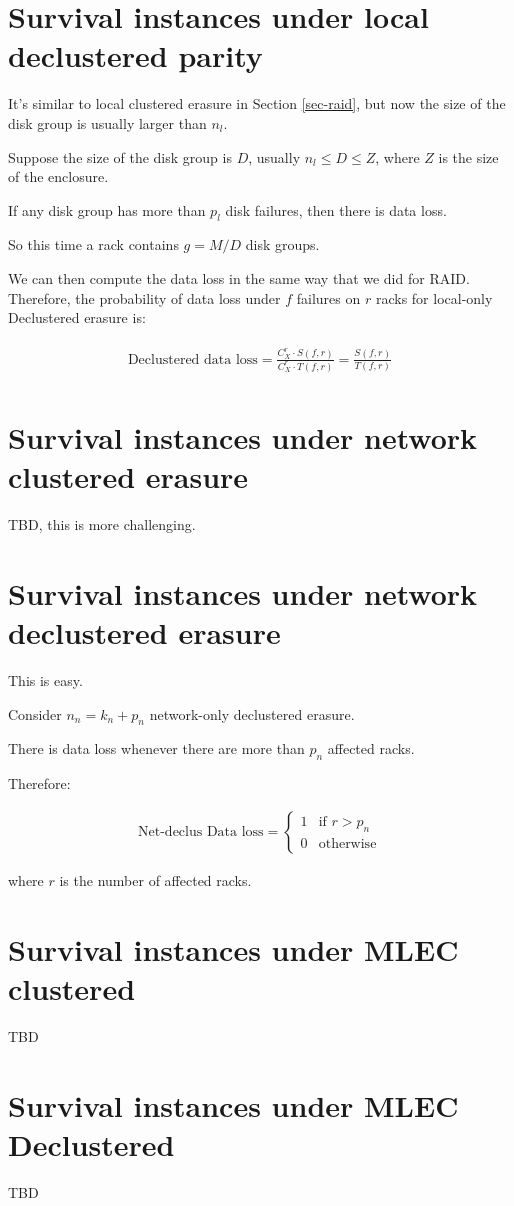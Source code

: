 \documentclass{article}
\begin{document}
\section{Survival instances under local declustered parity}

It's similar to local clustered erasure in Section \ref{sec-raid}, but now the size of the disk group is usually larger than $n_l$. 

Suppose the size of the disk group is $D$, usually $n_l \leq D \leq Z$, where $Z$ is the size of the enclosure.

If any disk group has more than $p_l$ disk failures, then there is data loss.

So this time a rack contains $g = M/D$ disk groups.

We can then compute the data loss in the same way that we did for RAID. Therefore, the probability of data loss under $f$ failures on $r$ racks for local-only Declustered erasure is:

\begin{eqnarray}
\begin{aligned}
\text{Declustered data loss} = \frac{C_{X}^{r} \cdot S(f,r)} 
{C_{X}^{r} \cdot T(f,r)}
= \frac{ S(f,r)} { T(f,r)}
\end{aligned}
\label{eq:dp:1}
\end{eqnarray}


\section{Survival instances under network clustered erasure}

TBD, this is more challenging.

\section{Survival instances under network declustered erasure}

This is easy.

Consider $n_n=k_n+p_n$ network-only declustered erasure.

There is data loss whenever there are more than $p_n$ affected racks.

Therefore:

\begin{eqnarray}
  \text{Net-declus Data loss} =
    \begin{cases}
      1 & \text{if $r > p_n$}\\
      0 & \text{otherwise}
    \end{cases}       
\label{eq:net_dp:1}
\end{eqnarray}

where $r$ is the number of affected racks.

\section{Survival instances under MLEC clustered}

TBD

\section{Survival instances under MLEC Declustered}

TBD
\end{document}
